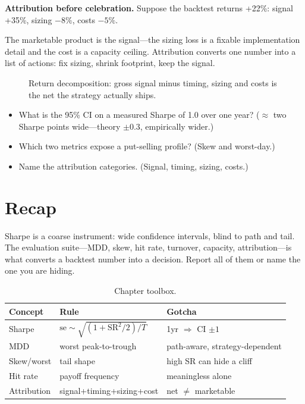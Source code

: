 \begin{example}\label{ex:attr}
\textbf{Attribution before celebration.} Suppose the backtest returns +22\%: signal
+35\%, sizing $-8\%$, costs $-5\%$.
\begin{solution}
The marketable product is the signal---the sizing loss is a fixable implementation
detail and the cost is a capacity ceiling. Attribution converts one number into a list
of actions: fix sizing, shrink footprint, keep the signal.
\end{solution}
\end{example}

\begin{figure}[htbp]\centering

\caption{Return decomposition: gross signal minus timing, sizing and costs is the net
the strategy actually ships.}
\label{fig:attr}
\end{figure}

\begin{checkpoint}
\begin{itemize}
\item What is the 95\% CI on a measured Sharpe of 1.0 over one year? ($\approx$ two
Sharpe points wide---theory $\pm0.3$, empirically wider.)
\item Which two metrics expose a put-selling profile? (Skew and worst-day.)
\item Name the attribution categories. (Signal, timing, sizing, costs.)
\end{itemize}
\end{checkpoint}

\section{Recap}\label{sec:evalrecap}

Sharpe is a coarse instrument: wide confidence intervals, blind to path and tail. The
evaluation suite---MDD, skew, hit rate, turnover, capacity, attribution---is what
converts a backtest number into a decision. Report all of them or name the one you
are hiding.

\begin{table}[htbp]\centering\small
\caption{Chapter toolbox.}
\begin{tabular}{@{}lll@{}}
\toprule
Concept & Rule & Gotcha\\
\midrule
Sharpe & $\mathrm{se}\sim\sqrt{(1+\mathrm{SR}^2/2)/T}$ & 1yr $\Rightarrow$ CI $\pm1$\\
MDD & worst peak-to-trough & path-aware, strategy-dependent\\
Skew/worst & tail shape & high SR can hide a cliff\\
Hit rate & payoff frequency & meaningless alone\\
Attribution & signal+timing+sizing+cost & net $\neq$ marketable\\
\bottomrule
\end{tabular}
\end{table}

